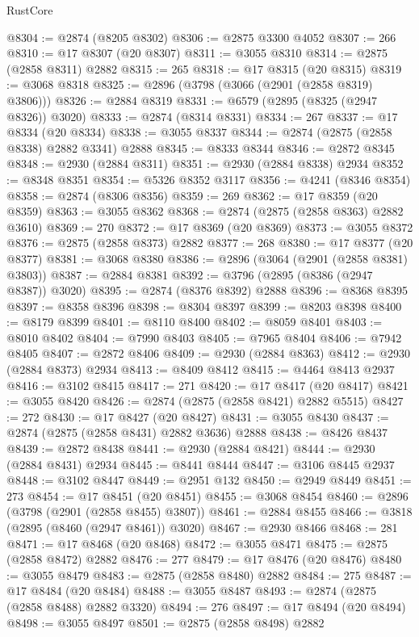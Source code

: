 \begin{lexlean}{RustCore}
\begin{coremodule}
@8304 := @2874 (@8205 @8302)
@8306 := @2875 @3300 @4052
@8307 := 266
@8310 := @17 @8307 (@20 @8307)
@8311 := @3055 @8310
@8314 := @2875 (@2858 @8311) @2882
@8315 := 265
@8318 := @17 @8315 (@20 @8315)
@8319 := @3068 @8318
@8325 := @2896 (@3798 (@3066 (@2901 (@2858 @8319) @3806)))
@8326 := @2884 @8319
@8331 := @6579 (@2895 (@8325 (@2947 @8326)) @3020)
@8333 := @2874 (@8314 @8331)
@8334 := 267
@8337 := @17 @8334 (@20 @8334)
@8338 := @3055 @8337
@8344 := @2874 (@2875 (@2858 @8338) @2882 @3341) @2888
@8345 := @8333 @8344
@8346 := @2872 @8345
@8348 := @2930 (@2884 @8311)
@8351 := @2930 (@2884 @8338) @2934
@8352 := @8348 @8351
@8354 := @5326 @8352 @3117
@8356 := @4241 (@8346 @8354)
@8358 := @2874 (@8306 @8356)
@8359 := 269
@8362 := @17 @8359 (@20 @8359)
@8363 := @3055 @8362
@8368 := @2874 (@2875 (@2858 @8363) @2882 @3610)
@8369 := 270
@8372 := @17 @8369 (@20 @8369)
@8373 := @3055 @8372
@8376 := @2875 (@2858 @8373) @2882
@8377 := 268
@8380 := @17 @8377 (@20 @8377)
@8381 := @3068 @8380
@8386 := @2896 (@3064 (@2901 (@2858 @8381) @3803))
@8387 := @2884 @8381
@8392 := @3796 (@2895 (@8386 (@2947 @8387)) @3020)
@8395 := @2874 (@8376 @8392) @2888
@8396 := @8368 @8395
@8397 := @8358 @8396
@8398 := @8304 @8397
@8399 := @8203 @8398
@8400 := @8179 @8399
@8401 := @8110 @8400
@8402 := @8059 @8401
@8403 := @8010 @8402
@8404 := @7990 @8403
@8405 := @7965 @8404
@8406 := @7942 @8405
@8407 := @2872 @8406
@8409 := @2930 (@2884 @8363)
@8412 := @2930 (@2884 @8373) @2934
@8413 := @8409 @8412
@8415 := @4464 @8413 @2937
@8416 := @3102 @8415
@8417 := 271
@8420 := @17 @8417 (@20 @8417)
@8421 := @3055 @8420
@8426 := @2874 (@2875 (@2858 @8421) @2882 @5515)
@8427 := 272
@8430 := @17 @8427 (@20 @8427)
@8431 := @3055 @8430
@8437 := @2874 (@2875 (@2858 @8431) @2882 @3636) @2888
@8438 := @8426 @8437
@8439 := @2872 @8438
@8441 := @2930 (@2884 @8421)
@8444 := @2930 (@2884 @8431) @2934
@8445 := @8441 @8444
@8447 := @3106 @8445 @2937
@8448 := @3102 @8447
@8449 := @2951 @132
@8450 := @2949 @8449
@8451 := 273
@8454 := @17 @8451 (@20 @8451)
@8455 := @3068 @8454
@8460 := @2896 (@3798 (@2901 (@2858 @8455) @3807))
@8461 := @2884 @8455
@8466 := @3818 (@2895 (@8460 (@2947 @8461)) @3020)
@8467 := @2930 @8466
@8468 := 281
@8471 := @17 @8468 (@20 @8468)
@8472 := @3055 @8471
@8475 := @2875 (@2858 @8472) @2882
@8476 := 277
@8479 := @17 @8476 (@20 @8476)
@8480 := @3055 @8479
@8483 := @2875 (@2858 @8480) @2882
@8484 := 275
@8487 := @17 @8484 (@20 @8484)
@8488 := @3055 @8487
@8493 := @2874 (@2875 (@2858 @8488) @2882 @3320)
@8494 := 276
@8497 := @17 @8494 (@20 @8494)
@8498 := @3055 @8497
@8501 := @2875 (@2858 @8498) @2882

\end{coremodule}
\end{lexlean}
